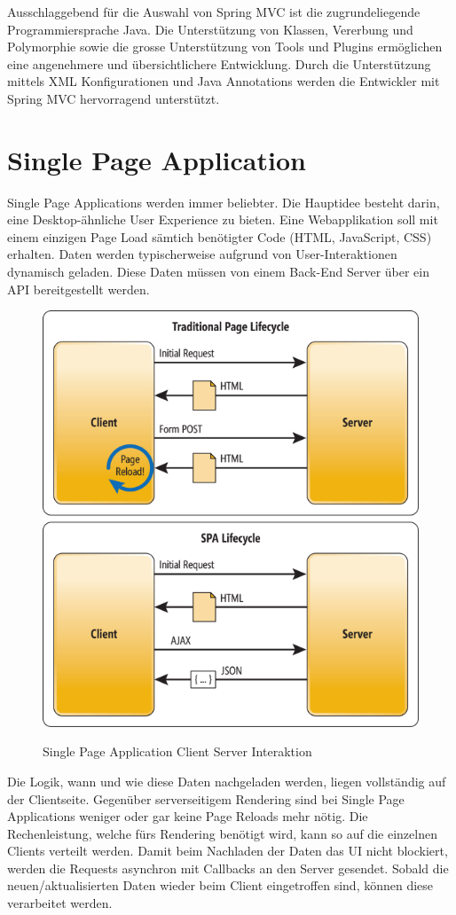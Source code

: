 Ausschlaggebend für die Auswahl von Spring MVC ist die zugrundeliegende Programmiersprache Java. Die Unterstützung von Klassen, Vererbung und Polymorphie sowie die grosse Unterstützung von Tools und Plugins ermöglichen eine angenehmere und übersichtlichere Entwicklung. Durch die Unterstützung mittels XML Konfigurationen und Java Annotations werden die Entwickler mit Spring MVC hervorragend unterstützt.

\newpage
\section{Single Page Application}
Single Page Applications werden immer beliebter. Die Hauptidee besteht darin, eine Desktop-ähnliche User Experience zu bieten. Eine Webapplikation soll mit einem einzigen Page Load sämtich benötigter Code (HTML, JavaScript, CSS) erhalten\cite{HSRSPA}. Daten werden typischerweise aufgrund von User-Interaktionen dynamisch geladen. Diese Daten müssen von einem Back-End Server über ein API bereitgestellt werden.
\begin{figure}[H]
\center
\includegraphics[scale=0.4]{images/single_page_application_lifecycle.png}\caption{Single Page Application Client Server Interaktion}\cite{MSDNSPA}
\end{figure}
Die Logik, wann und wie diese Daten nachgeladen werden, liegen vollständig auf der Clientseite. Gegenüber serverseitigem Rendering sind bei Single Page Applications weniger oder gar keine Page Reloads mehr nötig. Die Rechenleistung, welche fürs Rendering benötigt wird, kann so auf die einzelnen Clients verteilt werden. Damit beim Nachladen der Daten das UI nicht blockiert, werden die Requests asynchron mit Callbacks an den Server gesendet. Sobald die neuen/aktualisierten Daten wieder beim Client eingetroffen sind, können diese verarbeitet werden.

